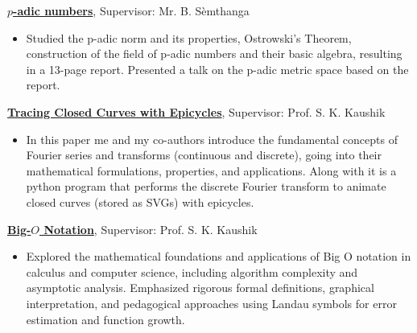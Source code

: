 {}
{\href{https://confumbit.github.io/assets/pdf/p-adic.pdf}
    {\textbf{$p$-adic numbers}}, Supervisor: Mr. B. Sèmthanga}
{
    \begin{itemize}
        \item Studied the p-adic norm and its properties, Ostrowski's Theorem, construction of the field of p-adic numbers and their basic algebra, resulting in a 13-page report.
              Presented a talk on the p-adic metric space based on the report.
    \end{itemize}
}

{}
{\href{https://confumbit.github.io/assets/pdf/epicycles-final-draft.pdf}
    {\textbf{Tracing Closed Curves with Epicycles}}, Supervisor: Prof. S. K. Kaushik}
{
    \begin{itemize}
        \item In this paper me and my co-authors introduce the fundamental concepts of Fourier series and transforms (continuous and discrete), going into their mathematical formulations, properties, and applications.
              Along with it is a python program that performs the discrete Fourier transform to animate closed curves (stored as SVGs) with epicycles.
    \end{itemize}
}

{}
{\href{https://confumbit.github.io/assets/pdf/big-O-notation.pdf}
    {\textbf{Big-$O$ Notation}}, Supervisor: Prof. S. K. Kaushik}
{
    \begin{itemize}
        \item Explored the mathematical foundations and applications of Big O notation in calculus and computer science, including algorithm complexity and asymptotic analysis.
              Emphasized rigorous formal definitions, graphical interpretation, and pedagogical approaches using Landau symbols for error estimation and function growth.
    \end{itemize}
}
